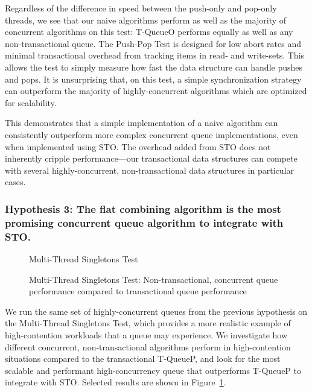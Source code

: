 Regardless of the difference in speed between the push-only and pop-only threads, we see that our naive algorithms perform as well as the majority of concurrent algorithms on this test: T-QueueO performs equally as well as any non-transactional queue. The Push-Pop Test is designed for low abort rates and minimal transactional overhead from tracking items in read- and write-sets. This allows the test to simply measure how fast the data structure can handle pushes and pops. It is unsurprising that, on this test, a simple synchronization strategy can outperform the majority of highly-concurrent algorithms which are optimized for scalability. 

This demonstrates that a simple implementation of a naive algorithm can consistently outperform more complex concurrent queue implementations, even when implemented using STO. The overhead added from STO does not inherently cripple performance---our transactional data structures can compete with several highly-concurrent, non-transactional data structures in particular cases. 

\vspace{12pt}
\noindent{}


\newpage
\subsubsection{Hypothesis 3: The flat combining algorithm is the most promising concurrent queue algorithm to integrate with STO.}
\label{eval:hypo3}

\begin{figure}[H]
    \centering
   	\begin{minipage}{0.75\textwidth}
        \caption*{Multi-Thread Singletons Test}
	\end{minipage}
    \caption{Multi-Thread Singletons Test: Non-transactional, concurrent queue performance compared to transactional queue performance}
    \label{fig:ntqs}
\end{figure}

We run the same set of highly-concurrent queues from the previous hypothesis on the Multi-Thread Singletons Test, which provides a more realistic example of high-contention workloads that a queue may experience. We investigate how different concurrent, non-transactional algorithms perform in high-contention situations compared to the transactional T-QueueP, and look for the most scalable and performant high-concurrency queue that outperforms T-QueueP to integrate with STO. Selected results are shown in Figure~\ref{fig:ntqs}.

